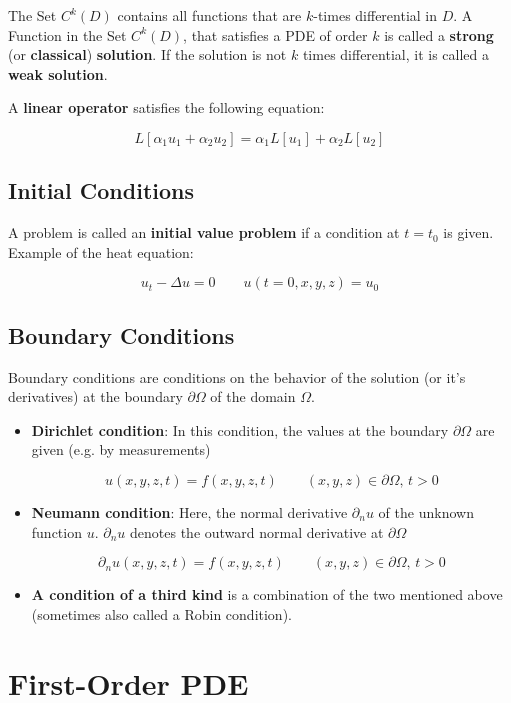 \documentclass[a4paper]{article}
\begin{document}
\begin{twocolumn}
The Set $C^k(D)$ contains all functions that are $k$-times differential in $D$. 
A Function in the Set $C^k(D)$, that satisfies a PDE of order $k$ is called a \textbf{strong} (or \textbf{classical}) \textbf{solution}. 
If the solution is not $k$ times differential, it is called a \textbf{weak solution}.

A \textbf{linear operator} satisfies the following equation:

$$L[\alpha_1 u_1 + \alpha_2 u_2] = \alpha_1 L[u_1] + \alpha_2 L[u_2]$$

\subsection{Initial Conditions}

A problem is called an \textbf{initial value problem} if a condition at $t = t_0$ is given. Example of the heat equation:

$$u_t - \Delta u = 0 \qquad u(t=0, x, y, z) = u_0$$

\subsection{Boundary Conditions}

Boundary conditions are conditions on the behavior of the solution (or it's derivatives) at the boundary $\partial \Omega$ of the domain $\Omega$. 

\begin{itemize}
	\item \textbf{Dirichlet condition}: In this condition, the values at the boundary $\partial \Omega$ are given (e.g. by measurements)
	
	$$u(x,y,z,t) = f(x,y,z,t) \qquad (x,y,z) \in \partial \Omega, \, t > 0$$
	
	\item \textbf{Neumann condition}: Here, the normal derivative $\partial_n u$ of the unknown function $u$. $\partial_n u$ denotes the outward normal derivative at $\partial \Omega$
	
	$$\partial_n u(x,y,z,t) = f(x,y,z,t) \qquad (x,y,z) \in \partial \Omega, \, t > 0$$
	
	\item \textbf{A condition of a third kind} is a combination of the two mentioned above (sometimes also called a Robin condition).
	
\end{itemize}

\pagebreak
\section{First-Order PDE}


\end{twocolumn}
\end{document}

